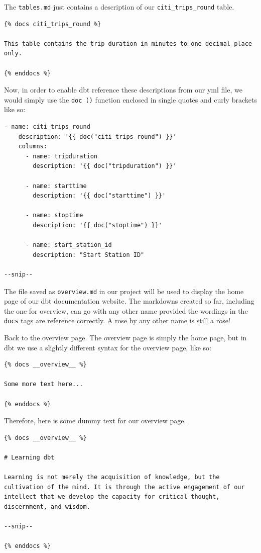 \documentclass[
]{book}
\begin{document}
The \texttt{tables.md} just contains a description of our \texttt{citi\_trips\_round} table.

\begin{verbatim}
{% docs citi_trips_round %}

This table contains the trip duration in minutes to one decimal place only. 

{% enddocs %}
\end{verbatim}

Now, in order to enable dbt reference these descriptions from our yml file, we would simply use the \texttt{doc\ ()} function enclosed in single quotes and curly brackets like so:

\begin{verbatim}
- name: citi_trips_round
    description: '{{ doc("citi_trips_round") }}'
    columns:
      - name: tripduration
        description: '{{ doc("tripduration") }}'

      - name: starttime
        description: '{{ doc("starttime") }}'
      
      - name: stoptime
        description: '{{ doc("stoptime") }}'

      - name: start_station_id
        description: "Start Station ID"
        
--snip--
\end{verbatim}

The file saved as \texttt{overview.md} in our project will be used to display the home page of our dbt documentation website. The markdowns created so far, including the one for overview, can go with any other name provided the wordings in the \texttt{docs} tags are reference correctly. A rose by any other name is still a rose!

Back to the overview page. The overview page is simply the home page, but in dbt we use a slightly different syntax for the overview page, like so:

\begin{verbatim}
{% docs __overview__ %}

Some more text here...

{% enddocs %}
\end{verbatim}

Therefore, here is some dummy text for our overview page.

\begin{verbatim}
{% docs __overview__ %}

# Learning dbt

Learning is not merely the acquisition of knowledge, but the cultivation of the mind. It is through the active engagement of our intellect that we develop the capacity for critical thought, discernment, and wisdom. 

--snip--

{% enddocs %}
\end{verbatim}
\end{document}
